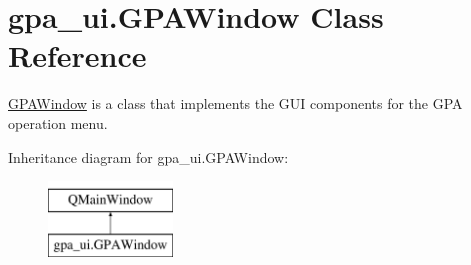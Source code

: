\hypertarget{classgpa__ui_1_1_g_p_a_window}{}\section{gpa\+\_\+ui.\+G\+P\+A\+Window Class Reference}
\label{classgpa__ui_1_1_g_p_a_window}


\hyperlink{classgpa__ui_1_1_g_p_a_window}{G\+P\+A\+Window} is a class that implements the G\+UI components for the G\+PA operation menu.  


Inheritance diagram for gpa\+\_\+ui.\+G\+P\+A\+Window\+:\begin{figure}[H]
\begin{center}
\leavevmode
\includegraphics[height=2.000000cm]{classgpa__ui_1_1_g_p_a_window}
\end{center}
\end{figure}
